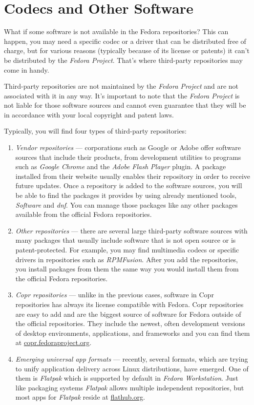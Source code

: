 \section*{Codecs and Other Software}

What if some software is not available in the Fedora repositories? This can happen, you may need a specific codec or a driver that can be distributed free of charge, but for various reasons (typically because of its license or patents) it can't be distributed by the \emph{Fedora Project}. That's where third-party repositories may come in handy.

Third-party repositories are not maintained by the \emph{Fedora Project} and are not associated with it in any way. It's important to note that the \emph{Fedora Project} is not liable for those software sources and cannot even guarantee that they will be in accordance with your local copyright and patent laws.

Typically, you will find four types of third-party repositories:
\begin{enumerate}
\item\emph{Vendor repositories} --- corporations such as Google or Adobe offer software sources that include their products, from development utilities to programs such as \emph{Google Chrome} and the \emph{Adobe Flash Player} plugin. A package installed from their website usually enables their repository in order to receive future updates. Once a repository is added to the software sources, you will be able to find the packages it provides by using already mentioned tools, \emph{Software} and \emph{dnf}. You can manage those packages like any other packages available from the official Fedora repositories.

\item\emph{Other repositories} --- there are several large third-party software sources with many packages that usually include software that is not open source or is patent-protected. For example, you may find multimedia codecs or specific drivers in repositories such as \emph{RPMFusion}. After you add the repositories, you install packages from them the same way you would install them from the official Fedora repositories.

\item\emph{Copr repositories} --- unlike in the previous cases, software in Copr repositories has always its license compatible with Fedora. Copr repositories are easy to add and are the biggest source of software for Fedora outside of the official repositories. They include the newest, often development versions of desktop environments, applications, and frameworks and you can find them at \url{copr.fedoraproject.org}.

\item\emph{Emerging universal app formats} --- recently, several formats, which are trying to unify application delivery across Linux distributions, have emerged. One of them is \emph{Flatpak} which is supported by default in \emph{Fedora Workstation}. Just like packaging systems \emph{Flatpak} allows multiple independent repositories, but most apps for \emph{Flatpak} reside at \url{flathub.org}.
\end{enumerate}

